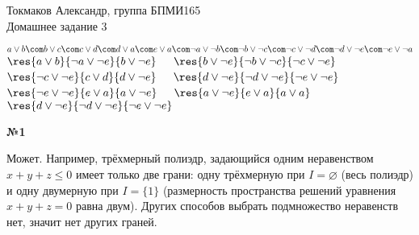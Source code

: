 \documentclass{article}
\newenvironment{task}{\begin{center}\fontsize{14}{14}\selectfont\bf}{\rm\fontsize{12}{12}\selectfont\end{center}}
\begin{document}
	\begin{center}
		Токмаков Александр, группа БПМИ165 \\
		Домашнее задание 3
	\end{center}
$a \vee b \com b \vee c \com c\vee d \com d\vee a \com e\vee a \com \neg a \vee \neg b \com \neg b \vee \neg c \com \neg c \vee \neg d \com \neg d \vee \neg e \com \neg e \vee\neg a$\\ \vspace{5px}
$\res{a\vee b}{\neg a \vee \neg e}{b \vee \neg e}\quad$
$\res{b \vee \neg e}{\neg b \vee\neg c}{\neg c \vee \neg e}\quad$
$\res{\neg c \vee \neg e}{c \vee d}{d \vee \neg e}\quad$
$\res{d \vee \neg e}{\neg d \vee \neg e}{\neg e \vee \neg e}\quad$ \\


$\res{\neg e \vee \neg e}{e \vee a}{a \vee \neg e}\quad$
$\res{a \vee \neg e}{e \vee a}{a \vee a}\quad$
$\res{d \vee \neg e}{\neg d \vee \neg e}{\neg e \vee \neg e}\quad$ \\
	
	\begin{task} 
		№1
	\end{task}
	Может. Например, трёхмерный полиэдр, задающийся одним неравенством $x + y + z \leq 0$ имеет только две грани: одну трёхмерную при $I = \varnothing$ (весь полиэдр) и одну двумерную при $I = \lbrace1\rbrace$ (размерность пространства решений уравнения $x+y+z = 0$ равна двум). Других способов выбрать подмножество неравенств нет, значит нет других граней.
	
	
	
\end{document}
